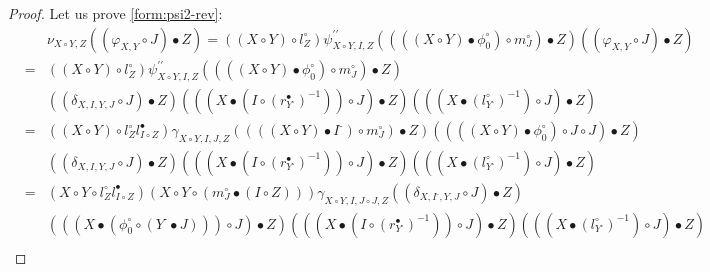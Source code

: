 \documentclass[nosumlimits,twoside]{amsart}
\theoremstyle{definition}
\theoremstyle{remark}
\def\revsn{\text{-}}
\begin{document}
\begin{proof}
Let us prove \eqref{form:psi2-rev}: 
\begin{eqnarray*}
&&\nu _{X\circ Y,Z}\left( \left( \varphi _{X,Y}\circ J\right) \bullet
Z\right) =\left( \left( X\circ Y\right) \circ l_{Z}^{\circ }\right) \psi
_{X\circ Y,I,Z}^{\prime \prime }\left( \left( \left( \left( X\circ Y\right)
\bullet \phi _{0}^{\circ }\right) \circ m_{J}^{\circ }\right) \bullet
Z\right) \left( \left( \varphi _{X,Y}\circ J\right) \bullet Z\right)  \\
&=&
\left( \left( X\circ Y\right) \circ l_{Z}^{\circ }\right) \psi _{X\circ
Y,I,Z}^{\prime \prime }\left( \left( \left( \left( X\circ Y\right) \bullet
\phi _{0}^{\circ }\right) \circ m_{J}^{\circ }\right) \bullet Z\right)  \\
&&\left( \left( \delta _{X,I,Y,J}\circ J\right) \bullet Z\right) \left( \left(
\left( X\bullet \left( I\circ \left( r_{Y^{\revsn}}^{\bullet }\right)
^{-1}\right) \right) \circ J\right) \bullet Z\right) \left( \left( \left(
X\bullet \left( l_{Y^{\revsn}}^{\circ }\right) ^{-1}\right) \circ J\right)
\bullet Z\right)\\
&=&
\left( \left( X\circ Y\right) \circ l_{Z}^{\circ }l_{I\circ Z}^{\bullet
}\right) \gamma _{X\circ Y,I,J,Z}\left( \left( \left( \left( X\circ Y\right)
\bullet I^{\revsn}\right) \circ m_{J}^{\circ }\right) \bullet Z\right)
\left( \left( \left( \left( X\circ Y\right) \bullet \phi _{0}^{\circ
}\right) \circ J\circ J\right) \bullet Z\right)  \\
&&\left( \left( \delta _{X,I,Y,J}\circ J\right) \bullet Z\right) \left( \left(
\left( X\bullet \left( I\circ \left( r_{Y^{\revsn}}^{\bullet }\right)
^{-1}\right) \right) \circ J\right) \bullet Z\right) \left( \left( \left(
X\bullet \left( l_{Y^{\revsn}}^{\circ }\right) ^{-1}\right) \circ J\right)
\bullet Z\right)\\
&=&
\left( X\circ Y\circ l_{Z}^{\circ }l_{I\circ Z}^{\bullet }\right) \left(
X\circ Y\circ \left( m_{J}^{\circ }\bullet \left( I\circ Z\right) \right)
\right) \gamma _{X\circ Y,I,J\circ J,Z}\left( \left( \delta _{X,I^{\revsn%
},Y,J}\circ J\right) \bullet Z\right)  \\
&&\left( \left( \left( X\bullet \left( \phi _{0}^{\circ }\circ \left( Y^{\revsn%
}\bullet J\right) \right) \right) \circ J\right) \bullet Z\right) \left(
\left( \left( X\bullet \left( I\circ \left( r_{Y^{\revsn}}^{\bullet }\right)
^{-1}\right) \right) \circ J\right) \bullet Z\right) \left( \left( \left(
X\bullet \left( l_{Y^{\revsn}}^{\circ }\right) ^{-1}\right) \circ J\right)
\bullet Z\right)\\

\end{eqnarray*}
\end{proof}
\end{document}
